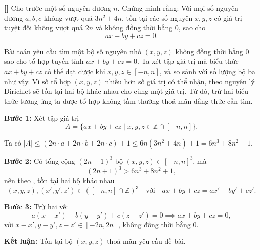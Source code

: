 \documentclass[../01-divisibility.tex]{subfiles}
\begin{document}
\begin{example*}\label{example:CHN-2015-TST1-D2-P2}\textbf{[]}
	Cho trước một số nguyên dương \( n \). Chứng minh rằng: Với mọi số nguyên dương \( a, b, c \) không vượt quá \( 3n^2 + 4n \),
	tồn tại các số nguyên \( x, y, z \) có giá trị tuyệt đối không vượt quá \( 2n \) và không đồng thời bằng 0, sao cho
	\[
		ax + by + cz = 0.
	\]
\end{example*}

\begin{story*}
	Bài toán yêu cầu tìm một bộ số nguyên nhỏ \( (x, y, z) \) không đồng thời bằng 0 sao cho tổ hợp tuyến tính \( ax + by + cz = 0 \).  
	Ta xét tập giá trị mà biểu thức \( ax + by + cz \) có thể đạt được khi \( x, y, z \in [-n, n] \), và so sánh với số lượng bộ ba như vậy.  
	Vì số tổ hợp \( (x, y, z) \) nhiều hơn số giá trị có thể nhận, theo nguyên lý Dirichlet sẽ tồn tại hai bộ khác nhau cho cùng một giá trị.  
	Từ đó, trừ hai biểu thức tương ứng ta được tổ hợp không tầm thường thoả mãn đẳng thức cần tìm.
\end{story*}

\begin{soln}\footnotemark
	\textbf{Bước 1:} Xét tập giá trị
	\[
		A = \{ ax + by + cz \mid x, y, z \in \mathbb{Z} \cap [-n, n] \}.
	\]

	Ta có \( |A| \leq (2n \cdot a + 2n \cdot b + 2n \cdot c) + 1 \le 6n(3n^2 + 4n) + 1 = 6n^3 + 8n^2 + 1 \).

	\textbf{Bước 2:} Có tổng cộng \( (2n + 1)^3 \) bộ \( (x, y, z) \in [-n, n]^3 \), mà
	\[
		(2n+1)^3 > 6n^3 + 8n^2 + 1,
	\]
	nên theo , tồn tại hai bộ khác nhau
	\[
		(x, y, z), (x', y', z') \in ([-n, n] \cap \mathbb{Z})^3 \quad \text{với} \quad ax + by + cz = ax' + by' + cz'.
	\]

	\textbf{Bước 3:} Trừ hai vế:
	\[
		a(x - x') + b(y - y') + c(z - z') = 0 \implies ax + by + cz = 0,
	\]
	với \( x - x', y - y', z - z' \in [-2n, 2n] \), không đồng thời bằng 0.

	\textbf{Kết luận:} Tồn tại bộ \( (x, y, z) \) thoả mãn yêu cầu đề bài.
\end{soln}

\end{document}

